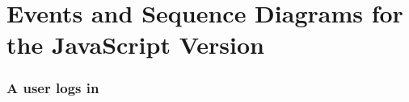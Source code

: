 \documentclass[12pt, a4paper, renqo, final]{amsart}
\let\stdsection\section
\renewcommand{\section}{\newpage\stdsection}
\begin{document}
		\section[RIA - Events and Sequence Diagrams]{Events and Sequence Diagrams for the JavaScript Version}
			\subsubsection{A user logs in}
				\phantom{.}\\
				\noindent {}
				\phantom{.}\\
				\newpage
			
\end{document}
